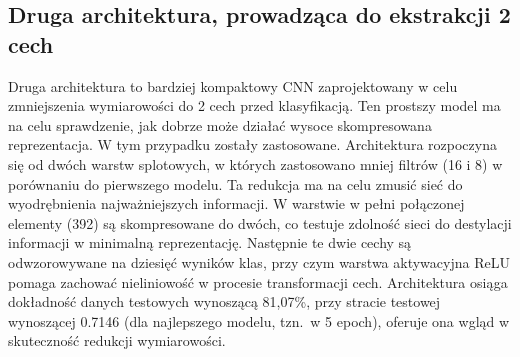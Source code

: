 \documentclass[10pt]{article}
\begin{document}
\subsection*{Druga architektura, prowadząca do ekstrakcji 2 cech}
Druga architektura to bardziej kompaktowy CNN zaprojektowany w celu zmniejszenia wymiarowości do 2 cech przed klasyfikacją. Ten prostszy model ma na celu sprawdzenie, jak dobrze może działać wysoce skompresowana reprezentacja. W tym przypadku zostały zastosowane.
Architektura rozpoczyna się od dwóch warstw splotowych, w których zastosowano mniej filtrów (16 i 8) w porównaniu do pierwszego modelu. Ta redukcja ma na celu zmusić sieć do wyodrębnienia najważniejszych informacji.
W warstwie w pełni połączonej elementy (392) są skompresowane do dwóch, co testuje zdolność sieci do destylacji informacji w minimalną reprezentację. Następnie te dwie cechy są odwzorowywane na dziesięć wyników klas, przy czym warstwa aktywacyjna ReLU pomaga zachować nieliniowość w procesie transformacji cech.
Architektura osiąga dokładność danych testowych wynoszącą 81,07\%, przy stracie testowej wynoszącej 0.7146 (dla najlepszego modelu, tzn.\ w 5 epoch), oferuje ona wgląd w skuteczność redukcji wymiarowości.
\end{document}
